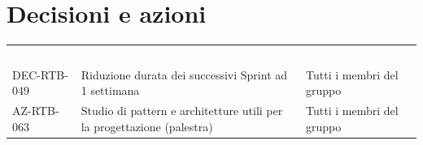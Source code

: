 \documentclass[a4paper, 11pt]{article}
\begin{document}
\section{Decisioni e azioni} \label{DecisioniAzioni}
\begin{center}
    \begin{tabular}{>{\centering\arraybackslash}m{3cm} >{\raggedright\arraybackslash}p{7cm} >{\centering\arraybackslash}p{2.5cm}}
        \rowcolor{AccentColor}
        \textcolor{white}{\textbf{Codice }} & 
        \multicolumn{1}{c}{\textcolor{white}{\textbf{Descrizione}}} & 
        \textcolor{white}{\textbf{Assegnatario}} \\
        DEC-RTB-049 & Riduzione durata dei successivi Sprint ad 1 settimana & Tutti i membri del gruppo \\
        \midrule
        AZ-RTB-063 & Studio di pattern e architetture utili per la progettazione (palestra) & Tutti i membri del gruppo\\
    \end{tabular}
\end{center}
\end{document}
